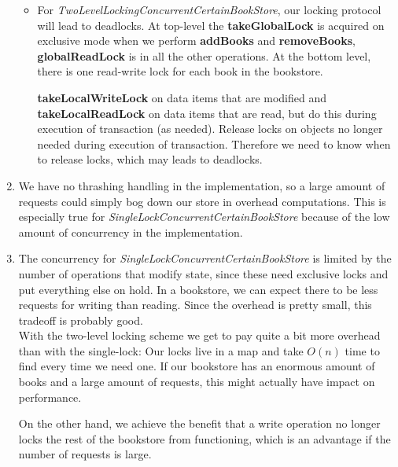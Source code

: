 \documentclass[11pt]{article}
\begin{document}
\begin{enumerate}
\begin{itemize}
		 \item
     For \textit{TwoLevelLockingConcurrentCertainBookStore}, our locking
     protocol will lead to deadlocks. At top-level the \textbf{takeGlobalLock}
     is acquired on exclusive mode when we perform \textbf{addBooks} and
     \textbf{removeBooks}, \textbf{globalReadLock} is in all the other
     operations. At the bottom level, there is one read-write lock for each book
     in the bookstore.

     \textbf{takeLocalWriteLock} on data items that are modified and
     \textbf{takeLocalReadLock} on data items that are read, but do this during
     execution of transaction (as needed). Release locks on objects no longer
     needed during execution of transaction. Therefore we need to know when to 
		 release locks, which may leads to deadlocks.
		\end{itemize}
  \item
    We have no thrashing handling in the implementation, so a large amount of
    requests could simply bog down our store in overhead computations. This is
    especially true for \textit{SingleLockConcurrentCertainBookStore} because of
    the low amount of concurrency in the implementation.
	
  \item
    The concurrency for \textit{SingleLockConcurrentCertainBookStore} is limited
    by the number of operations that modify state, since these need exclusive
    locks and put everything else on hold. In a bookstore, we can expect there
    to be less requests for writing than reading. Since the overhead is pretty
    small, this tradeoff is probably good.\\

    With the two-level locking scheme we get to pay quite a bit more overhead
    than with the single-lock: Our locks live in a map and take $O(n)$ time to
    find every time we need one. If our bookstore has an enormous amount of
    books and a large amount of requests, this might actually have impact on
    performance.

    On the other hand, we achieve the benefit that a write operation no longer
    locks the rest of the bookstore from functioning, which is an advantage if
    the number of requests is large.

\end{enumerate}
\end{document}
